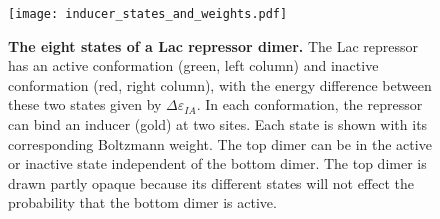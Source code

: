 \begin{figure}[h]
	\centering \texttt{[image: inducer\_states\_and\_weights.pdf]}
	\caption{{\bf The eight states of a Lac repressor dimer. } The Lac repressor has
		an active conformation (green, left column) and inactive conformation (red,
		right column), with the energy difference between these two states given by
		$\Delta \varepsilon_{IA}$. In each conformation, the repressor can bind an inducer (gold) at
		two sites. Each state is shown with its corresponding Boltzmann weight. The top
		dimer can be in the active or inactive state independent of the bottom dimer.
		The top dimer is drawn partly opaque because its different states will not
		effect the probability that the bottom dimer is active. %
	} \label{figrepressorInducerStates}
\end{figure}

